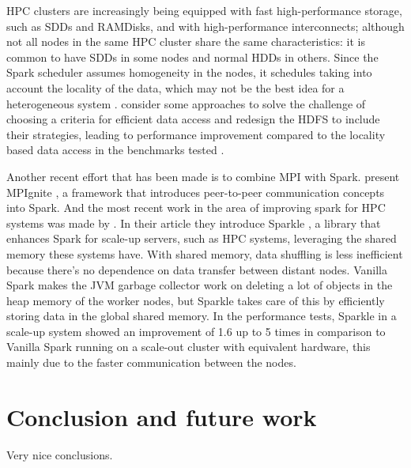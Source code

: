 \documentclass{article}
\begin{document}
HPC clusters are increasingly being equipped with fast high-performance storage, such as SDDs and RAMDisks, and with high-performance interconnects; although not all nodes in the same HPC cluster share the same characteristics: it is common to have SDDs in some nodes and normal HDDs in others. Since the Spark scheduler assumes homogeneity in the nodes, it schedules taking into account the locality of the data, which may not be the best idea for a heterogeneous system \cite{Islam2016}. \citeauthor{Islam2016} consider some approaches to solve the challenge of choosing a criteria for efficient data access and redesign the HDFS to include their strategies, leading to performance improvement compared to the locality based data access in the benchmarks tested \cite{Islam2016}.

Another recent effort that has been made is to combine MPI with Spark. \citeauthor{Morris2017} present MPIgnite \cite{Morris2017}, a framework that introduces peer-to-peer communication concepts into Spark. And the most recent work in the area of improving spark for HPC systems was made by \citeauthor{kim2017sparkle}. In their article they introduce Sparkle \cite{kim2017sparkle}, a library that enhances Spark for scale-up servers, such as HPC systems, leveraging the shared memory these systems have. With shared memory, data shuffling is less inefficient because there's no dependence on data transfer between distant nodes. Vanilla Spark makes the JVM garbage collector work on deleting a lot of objects in the heap memory of the worker nodes, but Sparkle takes care of this by efficiently storing data in the global shared memory. In the performance tests, Sparkle in a scale-up system showed an improvement of 1.6 up to 5 times in comparison to Vanilla Spark running on a scale-out cluster with equivalent hardware, this mainly due to the faster communication between the nodes.




\section{Conclusion and future work}

Very nice conclusions.


\printbibliography
\end{document}
